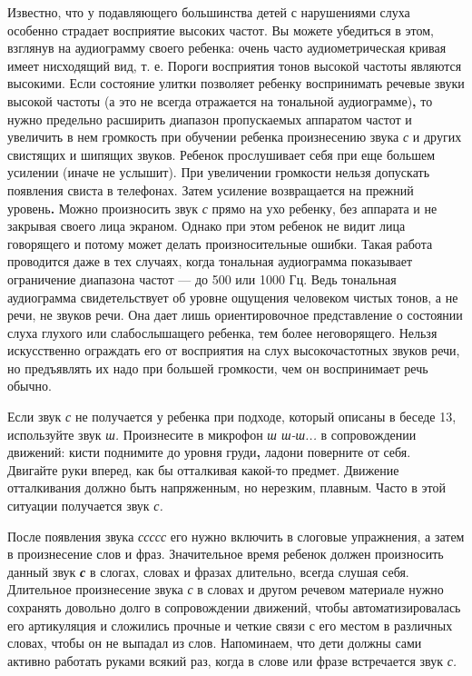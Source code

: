 \documentclass[a5paper]{book}
\renewcommand{\emph}[1]{\textit{#1}}
\begin{document}
Известно, что у подавляющего большинства детей с нарушениями слуха
особенно страдает восприятие высоких частот. Вы можете убедиться в этом,
взглянув на аудиограмму своего ребенка: очень часто аудиометрическая
кривая имеет нисходящий вид, т. е. Пороги восприятия тонов высокой
частоты являются высокими. Если состояние улитки позволяет ребенку
воспринимать речевые звуки высокой частоты (а это не всегда отражается
на тональной аудиограмме)\textbf{,} то нужно предельно расширить
диапазон пропускаемых аппаратом частот и увеличить в нем громкость при
обучении ребенка произнесению звука \emph{с} и других свистящих и
шипящих звуков. Ребенок прослушивает себя при еще большем усилении
(иначе не услышит). При увеличении громкости нельзя допускать появления
свиста в телефонах. Затем усиление возвращается на прежний
уровень\textbf{.} Можно произносить звук \emph{с} прямо на ухо ребенку,
без аппарата и не закрывая своего лица экраном. Однако при этом ребенок
не видит лица говорящего и потому может делать произносительные ошибки.
Такая работа проводится даже в тех случаях, когда тональная аудиограмма
показывает ограничение диапазона частот --- до 500 или 1000 Гц. Ведь
тональная аудиограмма свидетельствует об уровне ощущения человеком
чистых тонов, а не речи, не звуков речи. Она дает лишь ориентировочное
представление о состоянии слуха глухого или слабослышащего ребенка, тем
более неговорящего. Нельзя искусственно ограждать его от восприятия на
слух высокочастотных звуков речи, но предъявлять их надо при большей
громкости, чем он воспринимает речь обычно.

Если звук \emph{с} не получается у ребенка при подходе, который описаны
в беседе 13, используйте звук \emph{ш.} Произнесите в микрофон \emph{ш
ш-ш...} в сопровождении движений: кисти поднимите до уровня
груди\textbf{,} ладони поверните от себя. Двигайте руки вперед, как бы
отталкивая какой-то предмет. Движение отталкивания должно быть
напряженным, но нерезким, плавным. Часто в этой ситуации получается звук
\emph{с.}

После появления звука \emph{ссссс} его нужно включить в слоговые
упражнения, а затем в произнесение слов и фраз. Значительное время
ребенок должен произносить данный звук \emph{\textbf{с}} в слогах,
словах и фразах длительно, всегда слушая себя. Длительное произнесение
звука \emph{с} в словах и другом речевом материале нужно сохранять
довольно долго в сопровождении движений, чтобы автоматизировалась его
артикуляция и сложились прочные и четкие связи с его местом в различных
словах, чтобы он не выпадал из слов. Напоминаем, что дети должны сами
активно работать руками всякий раз, когда в слове или фразе встречается
звук \emph{с.}
\end{document}
